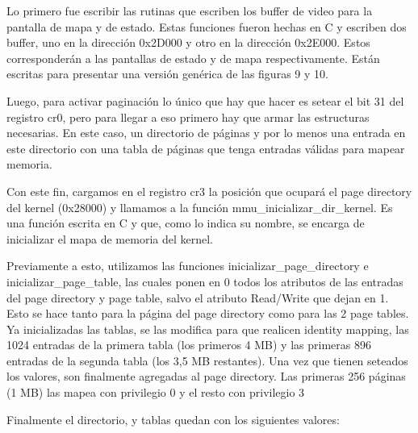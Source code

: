 \documentclass[10pt, a4paper]{article}
\begin{document}
Lo primero fue escribir las rutinas que escriben los buffer de video para la pantalla de mapa y de estado. Estas
funciones fueron hechas en C y escriben dos buffer, uno en la direcci\'on 0x2D000 y otro en la direcci\'on 0x2E000.
Estos corresponder\'an a las pantallas de estado y de mapa respectivamente. Est\'an escritas para presentar una versi\'on gen\'erica
de las figuras 9 y 10.


Luego, para activar paginaci\'on lo \'unico que hay que hacer es setear el bit 31 del registro cr0, pero para llegar a eso
primero hay que armar las estructuras necesarias. En este caso, un directorio de p\'aginas y por lo menos una entrada
en este directorio con una tabla de p\'aginas que tenga entradas v\'alidas para mapear memoria.

Con este fin, cargamos en el registro cr3 la posici\'on que ocupar\'a el page directory del kernel (0x28000) y llamamos
a la funci\'on mmu\_inicializar\_dir\_kernel. Es una funci\'on escrita en C y que, como lo indica su nombre, se encarga de
inicializar el mapa de memoria del kernel.

Previamente a esto, utilizamos las funciones inicializar\_page\_directory e inicializar\_page\_table, las cuales ponen en 0 todos 
los atributos de las entradas del page directory y page table, salvo el atributo Read/Write que dejan en 1. Esto se hace tanto para
la p\'agina del page directory como para las 2 page tables. Ya inicializadas las tablas, se las modifica para que
realicen identity mapping, las 1024 entradas de la primera tabla (los primeros 4 MB) y las primeras 896 entradas de la segunda
tabla (los 3,5 MB restantes). Una vez que tienen seteados los valores, son finalmente agregadas al page directory. Las primeras
256 p\'aginas (1 MB) las mapea con privilegio 0 y el resto con privilegio 3

Finalmente el directorio, y tablas quedan con los siguientes valores:
\end{document}
